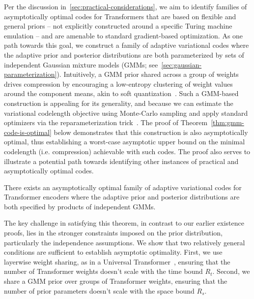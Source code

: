 Per the discussion in~\ref{sec:practical-considerations}, we aim to identify families of asymptotically optimal codes for Transformers that are based on flexible and general priors -- not explicitly constructed around a specific Turing machine emulation -- and are amenable to standard gradient-based optimization.
As one path towards this goal, we construct a family of adaptive variational codes where the adaptive prior and posterior distributions are both parameterized by sets of independent Gaussian mixture models (GMMs; see~\ref{sec:gaussian-parameterization}). Intuitively, a GMM prior shared across a group of weights drives compression by encouraging a low-entropy clustering of weight values around the component means, akin to soft quantization~\citep{ullrich2017soft,achterhold2018variational,han2016deep}. Such a GMM-based construction is appealing for its generality, and because we can estimate the variational codelength objective using Monte-Carlo sampling and apply standard optimizers via the reparameterization trick~\citep{kingma2014auto,jang2017categorical,maddison2017concrete}. The proof of Theorem~\ref{thm:gmm-code-is-optimal} below demonstrates that this construction is also asymptotically optimal, thus establishing a worst-case asymptotic upper bound on the minimal codelength (i.e. compression) achievable with such codes. The proof also serves to illustrate a potential path towards identifying other instances of practical and asymptotically optimal codes.

\begin{thm}\label{thm:gmm-code-is-optimal} There exists an asymptotically optimal family of adaptive variational codes for Transformer encoders where the adaptive prior and posterior distributions are both specified by products of independent GMMs.
\end{thm}

The key challenge in satisfying this theorem, in contrast to our earlier existence proofs, lies in the stronger constraints imposed on the prior distribution, particularly the independence assumptions. We show that two relatively general conditions are sufficient to establish asymptotic optimality. First, we use layerwise weight sharing, as in a Universal Transformer~\citep{dehghani2019universal}, ensuring that the number of Transformer weights doesn’t scale with the time bound $R_t$. Second, we share a GMM prior over groups of Transformer weights, ensuring that the number of prior parameters doesn't scale with the space bound $R_s$.

